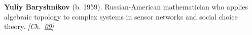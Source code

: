 \textbf{Yuliy Baryshnikov} (b. 1959). Russian-American mathematician who applies algebraic topology to complex systems in sensor networks and social choice theory. \emph{[Ch.~\hyperref[ch:arrowtheoremtopology]{09}]}

